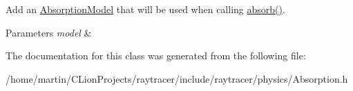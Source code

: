 Add an \hyperlink{classraytracer_1_1AbsorptionModel}{Absorption\+Model} that will be used when calling \hyperlink{classraytracer_1_1AbsorptionController_a5190d4b54293231350d30f3bf3acc59a}{absorb()}. 


\begin{DoxyParams}{Parameters}
{\em model} & \\
\hline
\end{DoxyParams}


The documentation for this class was generated from the following file\+:\begin{DoxyCompactItemize}
\item 
/home/martin/\+C\+Lion\+Projects/raytracer/include/raytracer/physics/Absorption.\+h\end{DoxyCompactItemize}
